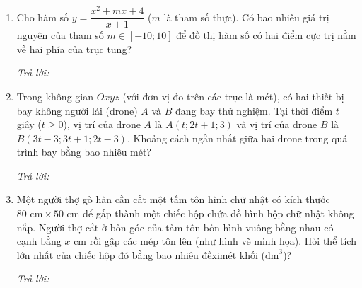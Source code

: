 \documentclass[12pt,a4paper]{article}
\newcommand{\otraloi}{\par\nobreak\smallskip\noindent\textit{Trả lời:}\quad\fbox{\rule{0pt}{11pt}\makebox[0.3cm]{}}\,\fbox{\rule{0pt}{11pt}\makebox[0.3cm]{}}\,\fbox{\rule{0pt}{11pt}\makebox[0.3cm]{}}\,\fbox{\rule{0pt}{11pt}\makebox[0.3cm]{}}}
\begin{document}
\newpage
\begin{enumerate}[start=3]
\item Cho hàm số $y=\dfrac{x^2+mx+4}{x+1}$ ($m$ là tham số thực). Có bao nhiêu giá trị nguyên của tham số $m\in[-10;10]$ để đồ thị hàm số có hai điểm cực trị nằm về hai phía của trục tung?
\otraloi

\item Trong không gian $Oxyz$ (với đơn vị đo trên các trục là mét), có hai thiết bị bay không người lái (drone) $A$ và $B$ đang bay thử nghiệm. Tại thời điểm $t$ giây ($t\ge 0$), vị trí của drone $A$ là $A(t;2t+1;3)$ và vị trí của drone $B$ là $B(3t-3;3t+1;2t-3)$. Khoảng cách ngắn nhất giữa hai drone trong quá trình bay bằng bao nhiêu mét?
\otraloi

\item Một người thợ gò hàn cần cắt một tấm tôn hình chữ nhật có kích thước $80\text{ cm} \times 50\text{ cm}$ để gấp thành một chiếc hộp chứa đồ hình hộp chữ nhật không nắp. Người thợ cắt ở bốn góc của tấm tôn bốn hình vuông bằng nhau có cạnh bằng $x\text{ cm}$ rồi gập các mép tôn lên (như hình vẽ minh họa). Hỏi thể tích lớn nhất của chiếc hộp đó bằng bao nhiêu đềximét khối ($\text{dm}^3$)?
\begin{center}
\par{}
\end{center}
\otraloi


\end{enumerate}
\end{document}
